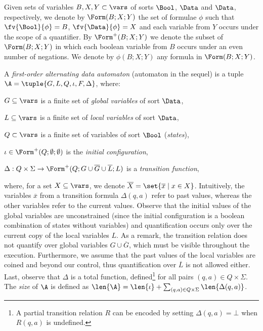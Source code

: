 Given sets of variables $B,X,Y \subset \vars$ of sorts $\Bool$,
$\Data$ and $\Data$, respectively, we denote by $\Form(B;X;Y)$ the set
of formulae $\phi$ such that $\fv{\Bool}{\phi} = B$, $\fv{\Data}{\phi}
= X$ and each variable from $Y$ occurs under the scope of a
quantifier. By $\Form^+(B;X;Y)$ we denote the subset of $\Form(B;X;Y)$
in which each boolean variable from $B$ occurs under an even number of
negations. We denote by $\phi(B;X;Y)$ any formula in $\Form(B;X;Y)$.

A \emph{first-order alternating data automaton} (automaton in the
sequel) is a tuple $\A = \tuple{G,L,Q,\iota,F,\Delta}$,
where: \begin{compactitem}
%
\item $G \subseteq \vars$ is a finite set of \emph{global
  variables} of sort $\Data$, 
%
\item $L \subseteq \vars$ is a finite set of \emph{local
  variables} of sort $\Data$,
%
\item $Q \subset \vars$ is a finite set of variables of sort $\Bool$
  (\emph{states}),
%
\item $\iota \in \Form^+(Q;\emptyset;\emptyset)$ is the \emph{initial
  configuration},
%
\item $\Delta : Q \times \Sigma \rightarrow
  \Form^+(Q;G\cup\overline{G}\cup\overline{L};L)$ is a
  \emph{transition function},
\end{compactitem}
where, for a set $X \subseteq \vars$, we denote $\overline{X} =
\set{\overline{x} \mid x \in X}$. Intuitively, the variables
$\overline{x}$ from a transition formula $\Delta(q,a)$ refer to past
values, whereas the other variables refer to the current
values. Observe that the initial values of the global variables are
unconstrained (since the initial configuration is a boolean
combination of states without variables) and quantification occurs
only over the current copy of the local variables $L$. As a remark,
the transition relation does not quantify over global variables $G
\cup \overline{G}$, which must be visible throughout the
execution. Furthermore, we assume that the past values of the local
variables are coined and beyond our control, thus quantification over
$\overline{L}$ is not allowed either. Last, observe that $\Delta$ is a
total function, defined\footnote{A partial transition relation $R$ can
  be encoded by setting $\Delta(q,a) = \bot$ when $R(q,a)$ is
  undefined.} for all pairs $(q,a) \in Q \times \Sigma$. The
\emph{size} of $\A$ is defined as $\len{\A} = \len{\iota} +
\sum_{(q,a) \in Q\times\Sigma}\len{\Delta(q,a)}$.

